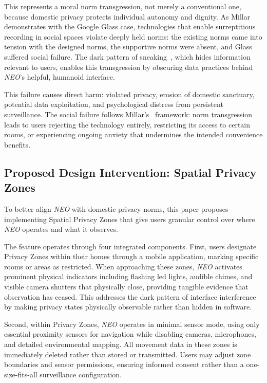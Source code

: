 \documentclass[11pt,showkeys]{../../shared/essay}
\newcommand{\neo}{\textit{NEO}}
\begin{document}
This represents a moral norm transgression, not merely a conventional one, because domestic privacy protects individual autonomy and dignity. As Millar~\cite{millar_social_2020} demonstrates with the Google Glass case, technologies that enable surreptitious recording in social spaces violate deeply held norms: the existing norms came into tension with the designed norms, the supportive norms were absent, and Glass suffered social failure. The dark pattern of sneaking~\cite{gray_dark_2018}, which hides information relevant to users, enables this transgression by obscuring data practices behind \neo{}'s helpful, humanoid interface.

This failure causes direct harm: violated privacy, erosion of domestic sanctuary, potential data exploitation, and psychological distress from persistent surveillance. The social failure follows Millar's~\cite{millar_social_2020} framework: norm transgression leads to users rejecting the technology entirely, restricting its access to certain rooms, or experiencing ongoing anxiety that undermines the intended convenience benefits.

\subsection{Proposed Design Intervention: Spatial Privacy Zones}

To better align \neo{} with domestic privacy norms, this paper proposes implementing Spatial Privacy Zones that give users granular control over where \neo{} operates and what it observes.

The feature operates through four integrated components. First, users designate Privacy Zones within their homes through a mobile application, marking specific rooms or areas as restricted. When approaching these zones, \neo{} activates prominent physical indicators including flashing \gls{led} lights, audible chimes, and visible camera shutters that physically close, providing tangible evidence that observation has ceased. This addresses the dark pattern of interface interference~\cite{gray_dark_2018} by making privacy states physically observable rather than hidden in software.

Second, within Privacy Zones, \neo{} operates in minimal sensor mode, using only essential proximity sensors for navigation while disabling cameras, microphones, and detailed environmental mapping. All movement data in these zones is immediately deleted rather than stored or transmitted. Users may adjust zone boundaries and sensor permissions, ensuring informed consent rather than a one-size-fits-all surveillance configuration.
\end{document}
